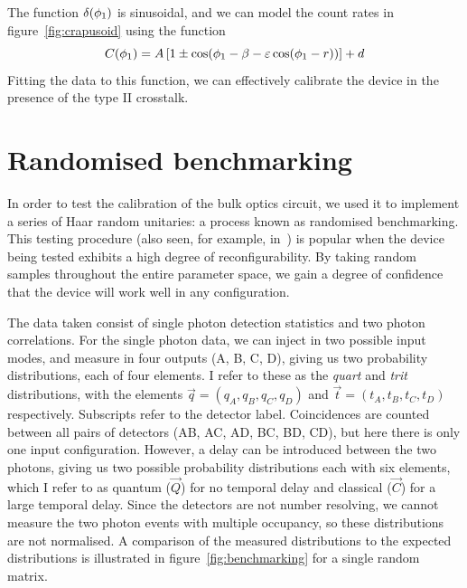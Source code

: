 The function \(\delta \!\left(\phi_{1}\right)\) is sinusoidal, and we can model the
count rates in figure~\ref{fig:crapusoid} using the function
\begin{equation}
  \label{eq:crapusoid}
  C \!\left(\phi_{1}\right) = A \left[ 1 \pm \cos \!\left( \phi_{1} - \beta - \varepsilon
  \cos \!\left( \phi_{1} - r\right)\right) \right] + d
\end{equation}
Fitting the data to this function, we can effectively calibrate the device in
the presence of the type II crosstalk. 

\section{Randomised benchmarking}
\label{sec:Benchmarking}
In order to test the calibration of the bulk optics circuit, we used it to
implement a series of Haar random unitaries: a process known as randomised
benchmarking. This testing procedure (also seen, for example,
in~\cite{peteschip}) is popular when the device being tested exhibits a high
degree of reconfigurability. By taking random samples throughout the entire
parameter space, we gain a degree of confidence that the device will work well
in any configuration.

The data taken consist of single photon detection statistics and two photon
correlations. For the single photon data, we can inject in two possible input
modes, and measure in four outputs (A, B, C, D), giving us two probability
distributions, each of four elements. I refer to these as the \emph{quart}
and \emph{trit} distributions, with the elements \(\vec{q}= \left( q_{A}, q_{B},
q_{C}, q_{D} \right)\) and \(\vec{t} = \left( t_{A}, t_{B}, t_{C}, t_{D}
\right)\) respectively. Subscripts refer to the detector label. Coincidences are
counted between all pairs of detectors (AB, AC, AD, BC, BD, CD), but here there
is only one input configuration. However, a delay can be introduced between
the two photons, giving us two possible probability distributions each with six
elements, which I refer to as quantum (\(\vec{Q}\)) for no temporal delay and
classical (\(\vec{C}\)) for a large temporal delay. Since the detectors are not
number resolving, we cannot measure the two photon events with multiple
occupancy, so these distributions are not normalised. A comparison of the
measured distributions to the expected distributions is illustrated in
figure~\ref{fig:benchmarking} for a single random matrix.

